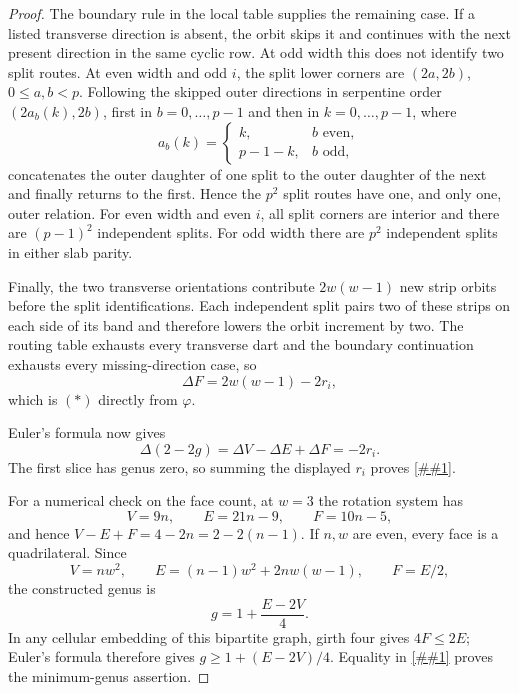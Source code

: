 \documentclass[11pt]{article}
\newcommand{\cref}[1]{\autoref{##1}}%
\begin{document}
\begin{proof}
The boundary rule in the local table supplies the remaining case.  If a
listed transverse direction is absent, the orbit skips it and continues
with the next present direction in the same cyclic row.  At odd width this
does not identify two split routes.  At even width and odd \(i\), the split
lower corners are
\((2a,2b)\), \(0\le a,b<p\).  Following the skipped outer directions in
serpentine order \((2a_b(k),2b)\), first in \(b=0,\ldots,p-1\) and then
in \(k=0,\ldots,p-1\), where
\[
 a_b(k)=\begin{cases}k,&b\text{ even},\\p-1-k,&b\text{ odd},\end{cases}
\]
concatenates the outer daughter of one split to the outer daughter of the
next and finally returns to the first.  Hence the \(p^2\) split routes have
one, and only one, outer relation.  For even width and even \(i\), all split
corners are interior and there are \((p-1)^2\) independent splits.  For odd
width there are \(p^2\) independent splits in either slab parity.

Finally, the two transverse orientations contribute \(2w(w-1)\) new strip
orbits before the split identifications.  Each independent split pairs two
of these strips on each side of its band and therefore lowers the orbit
increment by two.  The routing table exhausts every transverse dart and the
boundary continuation exhausts every missing-direction case, so
\[
 \Delta F=2w(w-1)-2r_i,
\]
which is \((*)\) directly from \(\varphi\).

Euler's formula now gives
\[
 \Delta(2-2g)=\Delta V-\Delta E+\Delta F=-2r_i.
\]
The first slice has genus zero, so summing the displayed \(r_i\) proves
\cref{eq:genus}.

For a numerical check on the face count, at \(w=3\) the rotation system has
\[
 V=9n,\qquad E=21n-9,\qquad F=10n-5,
\]
and hence \(V-E+F=4-2n=2-2(n-1)\).  If \(n,w\) are even, every face is a
quadrilateral.  Since
\[
 V=nw^2,\qquad E=(n-1)w^2+2nw(w-1),\qquad F=E/2,
\]
the constructed genus is
\begin{equation}\label{eq:even-genus-euler}
 g=1+\frac{E-2V}{4}.
\end{equation}
In any cellular embedding of this bipartite graph, girth four gives
\(4F\leq2E\); Euler's formula therefore gives
\(g\geq1+(E-2V)/4\).  Equality in \cref{eq:even-genus-euler} proves the
minimum-genus assertion.
\end{proof}
\end{document}
